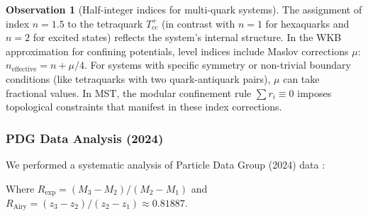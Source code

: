\documentclass[11pt, a4paper]{article}
\theoremstyle{plain}
\theoremstyle{definition}
\newtheorem{observation}[theorem]{Observation}
\begin{document}
\begin{observation}[Half-integer indices for multi-quark systems]
The assignment of index $n=1.5$ to the tetraquark $T_{cc}^+$ (in contrast with $n=1$ for hexaquarks and $n=2$ for excited states) reflects the system's internal structure. In the WKB approximation for confining potentials, level indices include Maslov corrections $\mu$: $n_{\text{effective}} = n + \mu/4$. For systems with specific symmetry or non-trivial boundary conditions (like tetraquarks with two quark-antiquark pairs), $\mu$ can take fractional values. In MST, the modular confinement rule $\sum r_i \equiv 0$ imposes topological constraints that manifest in these index corrections.
\end{observation}

\subsubsection{PDG Data Analysis (2024)}

We performed a systematic analysis of Particle Data Group (2024) data \cite{PDG2024}:

\begin{table}[H]
\centering
\caption{Dimensional compression analysis in hadronic spectra (Colab Data 2025)}
\label{tab:hadronic_compression}
\end{table}

Where $R_{\text{exp}} = (M_3 - M_2)/(M_2 - M_1)$ and $R_{\text{Airy}} = (z_3 - z_2)/(z_2 - z_1) \approx 0.81887$.
\end{document}
